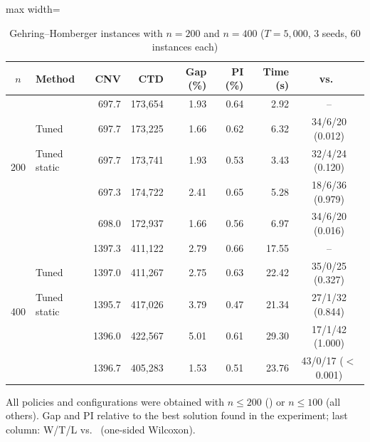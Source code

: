 \begin{table}[t]
\centering
\caption{Gehring--Homberger instances with $n=200$ and $n=400$ ($T=5{,}000$, 3 seeds, 60 instances each)}\label{tab:scale}
\setlength{\tabcolsep}{3pt}
\begin{adjustbox}{max width=\linewidth}
\begin{tabular}{clrrrrrc}
\toprule
$n$ & Method & CNV & CTD & Gap (\%) & PI (\%) & Time (s) & vs.\ \Rw{}\\ \midrule
\multirow{5}{*}{200} & \Rw{} & 697.7 & 173,654 & 1.93 & 0.64 & 2.92 & --\\
 & Tuned \Rw{} & 697.7 & 173,225 & 1.66 & 0.62 & 6.32 & 34/6/20 (0.012)\\
 & Tuned static & 697.7 & 173,741 & 1.93 & 0.53 & 3.43 & 32/4/24 (0.120)\\
 & \sgalns{} & 697.3 & 174,722 & 2.41 & 0.65 & 5.28 & 18/6/36 (0.979)\\
 & \sgc{} & 698.0 & 172,937 & 1.66 & 0.56 & 6.97 & 34/6/20 (0.016)\\ \midrule
\multirow{5}{*}{400} & \Rw{} & 1397.3 & 411,122 & 2.79 & 0.66 & 17.55 & --\\
 & Tuned \Rw{} & 1397.0 & 411,267 & 2.75 & 0.63 & 22.42 & 35/0/25 (0.327)\\
 & Tuned static & 1395.7 & 417,026 & 3.79 & 0.47 & 21.34 & 27/1/32 (0.844)\\
 & \sgalns{} & 1396.0 & 422,567 & 5.01 & 0.61 & 29.30 & 17/1/42 (1.000)\\
 & \sgc{} & 1396.7 & 405,283 & 1.53 & 0.51 & 23.76 & 43/0/17 ($<$0.001)\\
\bottomrule
\end{tabular}
\end{adjustbox}
\par\vspace{2pt}\parbox{\linewidth}{\footnotesize All policies and configurations were obtained with $n\le200$ (\sgc{}) or $n\le100$ (all others). Gap and PI relative to the best solution found in the experiment; last column: W/T/L vs.\ \Rw{} (one-sided Wilcoxon).}
\end{table}
